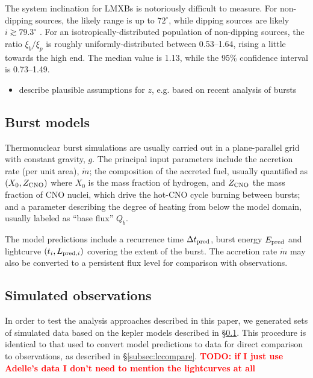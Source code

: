 \documentclass{aastex63}
\newcommand{\todo}[1]{\textbf{\textcolor{red}{TODO: #1}}} %
\begin{document}
The system inclination for LMXBs is notoriously difficult to measure. For non-dipping sources, the likely range is up to $72^\circ$, while dipping sources are likely $i\gtrsim79.3^\circ$ \cite[]{gal16a}.
% 
For an isotropically-distributed population of non-dipping sources, the ratio $\xi_b/\xi_p$ is roughly uniformly-distributed between 0.53--1.64, rising a little towards the high end. The median value is 1.13, while the 95\% confidence interval is 0.73--1.49.

\begin{itemize}
\item describe plausible assumptions for $z$, e.g. based on recent analysis of bursts
\end{itemize}

\subsection{Burst models}
\label{subsec:models}

Thermonuclear burst simulations \cite[e.g. with {\sc kepler};][]{woos04} are usually carried out in a plane-parallel grid with constant gravity, $g$. The principal input parameters include the accretion rate (per unit area), $\dot{m}$; the composition of the accreted fuel, usually quantified as $(X_0, Z_{\rm CNO})$ where $X_0$ is the mass fraction of hydrogen, and $Z_{\rm CNO}$ the mass fraction of CNO nuclei, which drive the hot-CNO cycle burning between bursts; and a parameter describing the degree of heating from below the model domain, usually labeled as ``base flux'' $Q_b$.

The model predictions include a recurrence time $\Delta t_{\rm pred}$, burst energy $E_{\rm pred}$ and lightcurve $(t_i,L_{{\rm pred},i})$ covering the extent of the burst.
%
The accretion rate $\dot{m}$ may also be converted to a persistent flux level for comparison with observations.


\subsection{Simulated observations}
\label{subsec:simobs}

In order to test the analysis approaches described in this paper, we generated sets of simulated data based on the {\sc kepler} models described in \S\ref{subsec:models}. 
%
This procedure is identical to that used to convert model predictions to data for direct comparison to observations, as described in \S\ref{subsec:lccompare}.
%
\todo{if I just use Adelle's data I don't need to mention the lightcurves at all}
\end{document}
